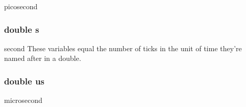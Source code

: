 picosecond \hypertarget{namespaceSimClock_1_1Float_ad62e712560f6344b96d4c080a2ba9c92}{
\subsubsection[{s}]{\setlength{\rightskip}{0pt plus 5cm}double {\bf s}}}
\label{namespaceSimClock_1_1Float_ad62e712560f6344b96d4c080a2ba9c92}


second These variables equal the number of ticks in the unit of time they're named after in a double. \hypertarget{namespaceSimClock_1_1Float_ae7c3f130041d41277e5d8509f85fa4c6}{
\subsubsection[{us}]{\setlength{\rightskip}{0pt plus 5cm}double {\bf us}}}
\label{namespaceSimClock_1_1Float_ae7c3f130041d41277e5d8509f85fa4c6}


microsecond 